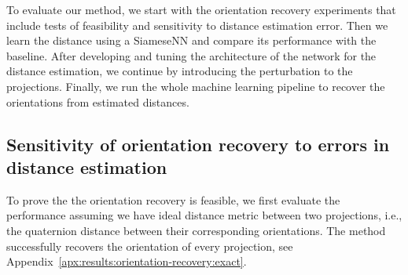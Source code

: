 

 To evaluate our method, we start with the orientation recovery experiments that include tests of feasibility and sensitivity to distance estimation error. Then we learn the distance using a SiameseNN and compare its performance with the baseline. After developing and tuning the architecture of the network for the distance estimation, we continue by introducing the perturbation to the projections. Finally, we run the whole machine learning pipeline to recover the orientations from estimated distances.





\subsection{Sensitivity of orientation recovery to errors in distance estimation}\label{sec:results:orientation-recovery:sensitivity}


To prove the the orientation recovery is feasible, we first evaluate the performance assuming we have ideal distance metric between two projections, i.e., the quaternion distance between their corresponding orientations. The method successfully recovers the orientation of every projection, see Appendix~\ref{apx:results:orientation-recovery:exact}.

